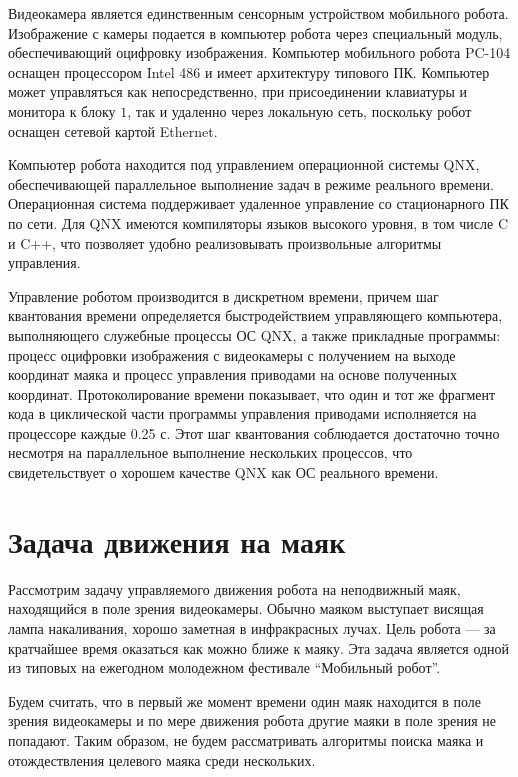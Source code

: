 Видеокамера является единственным сенсорным устройством мобильного
робота.  Изображение с камеры подается в компьютер робота через
специальный модуль, обеспечивающий оцифровку изображения.  Компьютер
мобильного робота PC-104 оснащен процессором Intel 486 и имеет
архитектуру типового ПК.  Компьютер может управляться как
непосредственно, при присоединении клавиатуры и монитора к блоку $1$,
так и удаленно через локальную сеть, поскольку робот оснащен сетевой
картой Ethernet.

Компьютер робота находится под управлением операционной системы QNX,
обеспечивающей параллельное выполнение задач в режиме реального
времени.  Операционная система поддерживает удаленное управление со
стационарного ПК по сети.  Для QNX имеются компиляторы языков высокого
уровня, в том числе {\sf C} и {\sf C++}, что позволяет удобно
реализовывать произвольные алгоритмы управления.

Управление роботом производится в дискретном времени, причем шаг
квантования времени определяется быстродействием управляющего
компьютера, выполняющего служебные процессы ОС QNX, а также прикладные
программы: процесс оцифровки изображения с видеокамеры с получением на
выходе координат маяка и процесс управления приводами на основе
полученных координат.  Протоколирование времени показывает, что один и
тот же фрагмент кода в циклической части программы управления
приводами исполняется на процессоре каждые 0.25 с.  Этот шаг
квантования соблюдается достаточно точно несмотря на параллельное
выполнение нескольких процессов, что свидетельствует о хорошем
качестве QNX как ОС реального времени.

\section{Задача движения на маяк}

Рассмотрим задачу управляемого движения робота на неподвижный маяк,
находящийся в поле зрения видеокамеры.  Обычно маяком выступает
висящая лампа накаливания, хорошо заметная в инфракрасных лучах.  Цель
робота --- за кратчайшее время оказаться как можно ближе к маяку.  Эта
задача является одной из типовых на ежегодном молодежном фестивале
``Мобильный робот''.

Будем считать, что в первый же момент времени один маяк находится в
поле зрения видеокамеры и по мере движения робота другие маяки в поле
зрения не попадают.  Таким образом, не будем рассматривать алгоритмы
поиска маяка и отождествления целевого маяка среди нескольких.

